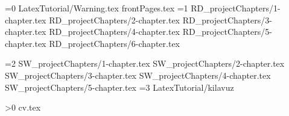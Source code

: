\documentclass[a4paper,12pt,oneside,openany]{book}
\begin{document}
\newcommand{\projecttype}{0}
\ifnum\projecttype=0
 {LatexTutorial/Warning.tex}
\else
 {frontPages.tex}
\fi
\ifnum\projecttype=1
 {RD_projectChapters/1-chapter.tex}
 {RD_projectChapters/2-chapter.tex}
 {RD_projectChapters/3-chapter.tex}
 {RD_projectChapters/4-chapter.tex}
 {RD_projectChapters/5-chapter.tex}
 {RD_projectChapters/6-chapter.tex}

\fi
\ifnum\projecttype=2
 {SW_projectChapters/1-chapter.tex}
 {SW_projectChapters/2-chapter.tex}
 {SW_projectChapters/3-chapter.tex}
 {SW_projectChapters/4-chapter.tex}
 {SW_projectChapters/5-chapter.tex}
\fi
\ifnum\projecttype=3
 {LatexTutorial/kilavuz}
\fi

\newpage\appendix


\newpage
{}
\singlespacing
\printbibliography[title={\bibName}]

\ifnum{}
\newpage
{}

\ifnum\projecttype>0
 {cv.tex}
\fi
\fi
\end{document}
